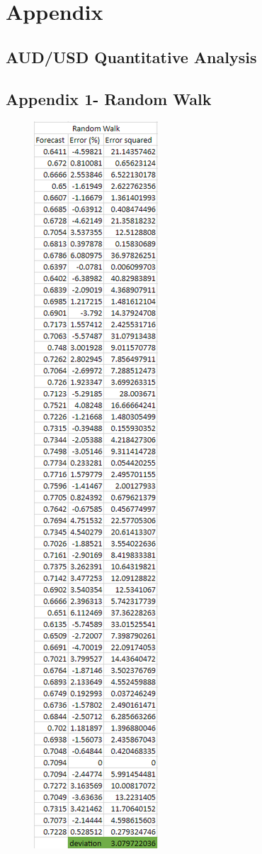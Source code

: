 \documentclass{article}
\let\Oldsubsection\subsection
\renewcommand{\subsection}{\FloatBarrier\Oldsubsection}
\begin{document}
\break

\section*{Appendix}

\subsection*{AUD/USD Quantitative Analysis}

\subsection*{Appendix 1- Random Walk}


\begin{figure}[h!]
    \centering
    \includegraphics[scale=0.5]{graphs/appendix1.png}

\end{figure}
\end{document}
